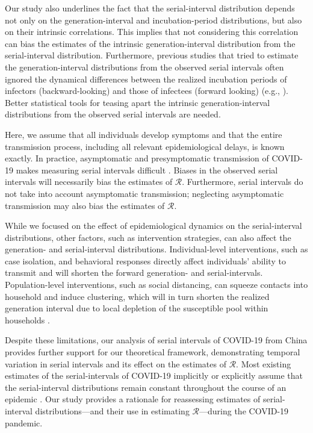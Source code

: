 \documentclass[12pt]{article}
\newcommand{\RR}{\ensuremath{{\mathcal R}}\xspace}
\begin{document}
Our study also underlines the fact that the serial-interval distribution depends not only on the generation-interval and incubation-period distributions, but also on their intrinsic correlations.
This implies that not considering this correlation can bias the estimates of the intrinsic generation-interval distribution from the serial-interval distribution.
Furthermore, previous studies that tried to estimate the generation-interval distributions from the observed serial intervals often ignored the dynamical differences between the realized incubation periods of infectors (backward-looking) and those of infectees (forward looking) (e.g., \cite{klinkenberg2011correlation, ganyani2020estimating}).
Better statistical tools for teasing apart the intrinsic generation-interval distributions from the observed serial intervals are needed.

Here, we assume that all individuals develop symptoms and that the entire transmission process, including all relevant epidemiological delays, is known exactly.
In practice, asymptomatic and presymptomatic transmission of COVID-19 makes measuring serial intervals difficult \citep{bai2020presumed,he2020temporal,wei2020presymptomatic}.
Biases in the observed serial intervals will necessarily bias the estimates of \RR. 
Furthermore, serial intervals do not take into account asymptomatic transmission; 
neglecting asymptomatic transmission may also bias the estimates of \RR \citep{park2020time}.

While we focused on the effect of epidemiological dynamics on the serial-interval distributions, other factors, such as intervention strategies, can also affect the generation- and serial-interval distributions.
Individual-level interventions, such as case isolation, and behavioral responses directly affect individuals' ability to transmit and will shorten the forward generation- and serial-intervals.
Population-level interventions, such as social distancing, can squeeze contacts into household and induce clustering, which will in turn shorten the realized generation interval due to local depletion of the susceptible pool within households \citep{park2019inferring}.

Despite these limitations, our analysis of serial intervals of COVID-19 from China provides further support for our theoretical framework, demonstrating temporal variation in serial intervals and its effect on the estimates of \RR.
Most existing estimates of the serial-intervals of COVID-19 implicitly or explicitly assume that the serial-interval distributions remain constant throughout the course of an epidemic \citep{du2020serial, he2020temporal, nishiura2020serial,tindale2020transmission,zhao2020estimating,zhang2020evolving}.
Our study provides a rationale for reassessing estimates of
serial-interval distributions---and their use in estimating
\RR---during the COVID-19 pandemic.
\end{document}
